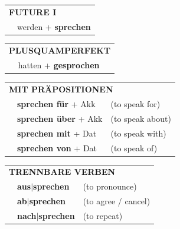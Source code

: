 \documentclass[10pt,a4paper]{revtex4-2}
\begin{document}
\begin{verbbox}
\begin{tabular}{rl}
    \multicolumn{2}{l}{\textbf{FUTURE I} }\\
   & werden + \textbf{sprechen}\\
 
  \end{tabular}
\hfill
   \begin{tabular}{rl}
      \multicolumn{2}{l}{\textbf{PLUSQUAMPERFEKT}}\\
   & hatten + \textbf{gesprochen}\\
  \end{tabular}
  
   \vspace{10pt}

   \begin{tabular}{lll}
      \multicolumn{3}{l}{\textbf{MIT PRÄPOSITIONEN}}\\
&\textbf{sprechen für} + Akk & (to speak for)\\
& \textbf{sprechen über} + Akk & (to speak about)\\
& \textbf{sprechen mit} + Dat & (to speak with)\\
&\textbf{sprechen von} + Dat & (to speak of)
  \end{tabular}
  \hfill
   \begin{tabular}{lll}
      \multicolumn{3}{l}{\textbf{TRENNBARE VERBEN}}\\
 & \textbf{aus$|$sprechen} & (to pronounce)\\
&\textbf{ab$|$sprechen} & (to agree / cancel)\\
&\textbf{nach$|$sprechen} & (to repeat)
\vspace{10pt}
  \end{tabular}
  

  \vspace{-5pt}


\end{verbbox}
\end{document}
